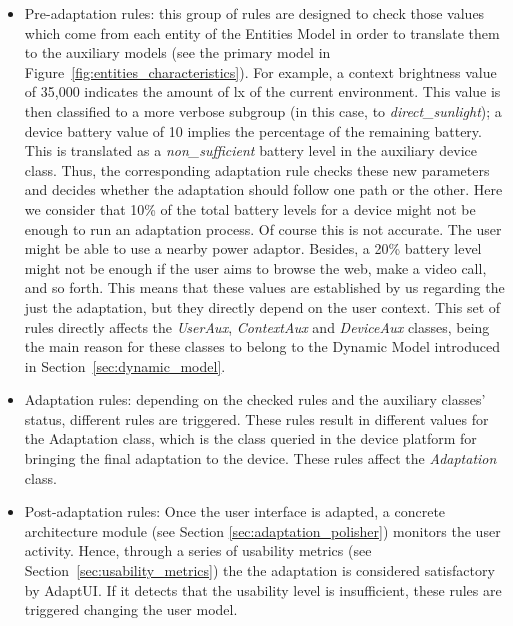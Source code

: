 \begin{itemize}
 \item Pre-adaptation rules: this group of rules are designed to check those
 values which come from each entity of the Entities Model in order to translate
 them to the auxiliary models (see the primary model in Figure~\ref{fig:entities_characteristics}).
 For example, a context brightness value of 35,000 indicates the amount of \ac{lx}
 of the current environment. This value is then classified to a more verbose
 subgroup (in this case, to \textit{direct\_sunlight}); a device battery
 value of 10 implies the percentage of the remaining battery. This is translated
 as a \textit{non\_sufficient} battery level in the auxiliary device class. Thus,
 the corresponding adaptation rule checks these new parameters and decides whether
 the adaptation should follow one path or the other. Here we consider that 10\%
 of the total battery levels for a device might not be enough to run an
 adaptation process. Of course this is not accurate. The user might be able to
 use a nearby power adaptor. Besides, a 20\% battery level might not be enough 
 if the user aims to browse the web, make a video call, and so forth. This means
 that these values are established by us regarding the just the adaptation, but
 they directly depend on the user context. This set of rules directly affects
 the \textit{UserAux}, \textit{ContextAux} and \textit{DeviceAux} classes, being
 the main reason for these classes to belong to the Dynamic Model introduced in
 Section~\ref{sec:dynamic_model}.
 
 \item Adaptation rules: depending on the checked rules and the auxiliary classes’
 status, different rules are triggered. These rules result in different values
 for the Adaptation class, which is the class queried in the device platform for
 bringing the final adaptation to the device. These rules affect the 
 \textit{Adaptation} class.
 
 \item Post-adaptation rules: Once the user interface is adapted, a concrete
 architecture module (see Section \ref{sec:adaptation_polisher}) monitors the
 user activity. Hence, through a series of usability metrics (see 
 Section~\ref{sec:usability_metrics}) the the adaptation is considered satisfactory 
 by AdaptUI. If it detects that the usability level is insufficient, these rules
 are triggered changing the user model.
\end{itemize}

